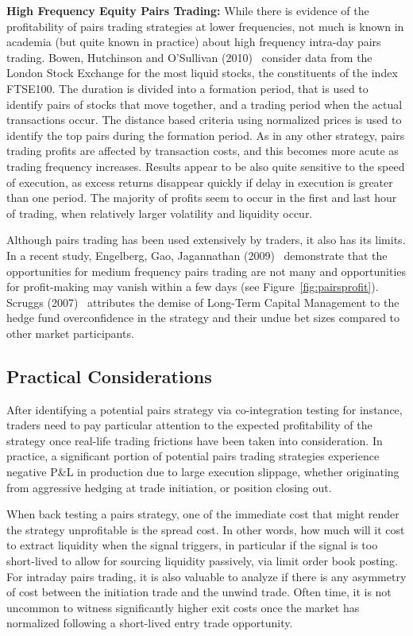 \noindent\textbf{High Frequency Equity Pairs Trading:} While there is evidence of the profitability of pairs trading strategies at lower frequencies, not much is known in academia (but quite known in practice) about high frequency intra-day pairs trading. Bowen, Hutchinson and O'Sullivan (2010)~\cite{bho} consider data from the London Stock Exchange for the most liquid stocks, the constituents of the index FTSE100. The duration is divided into a formation period, that is used to identify pairs of stocks that move together, and a trading period when the actual transactions occur. The distance based criteria using normalized prices is used to identify the top pairs during the formation period. As in any other strategy, pairs trading profits are affected by transaction costs, and this becomes more acute as trading frequency increases. Results appear to be also quite sensitive to the speed of execution, as excess returns disappear quickly if delay in execution is greater than one period. The majority of profits seem to occur in the first and last hour of trading, when relatively larger volatility and liquidity occur.


Although pairs trading has been used extensively by traders, it also has its limits. In a recent study, Engelberg, Gao, Jagannathan (2009)~\cite{engelberg2009anatomy} demonstrate that the opportunities for medium frequency pairs trading are not many and opportunities for profit-making may vanish within a few days (see Figure~\ref{fig:pairsprofit}). Scruggs (2007)~\cite{scruggs} attributes the demise of Long-Term Capital Management to the hedge fund overconfidence in the strategy and their undue bet sizes compared to other market participants.


\subsection{Practical Considerations \label{s:pract_consid}}

After identifying a potential pairs strategy via co-integration testing for instance, traders need to pay particular attention to the expected profitability of the strategy once real-life trading frictions have been taken into consideration. In practice, a significant portion of potential pairs trading strategies experience negative P\&L in production due to large execution slippage, whether originating from aggressive hedging at trade initiation, or position closing out.


When back testing a pairs strategy, one of the immediate cost that might render the strategy unprofitable is the spread cost. In other words, how much will it cost to extract liquidity when the signal triggers, in particular if the signal is too short-lived to allow for sourcing liquidity passively, via limit order book posting. For intraday pairs trading, it is also valuable to analyze if there is any asymmetry of cost between the initiation trade and the unwind trade. Often time, it is not uncommon to witness significantly higher exit costs once the market has normalized following a short-lived entry trade opportunity. 


